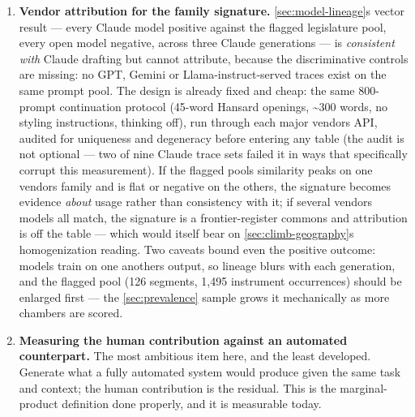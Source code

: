\begin{enumerate}
  This pairs directly with item 4. A register-feature profile is a measurable
  \emph{automated counterpart}: it says what an aligned model\textquotesingle s stance profile
  looks like on the same task, so a speaker\textquotesingle s distance from it is the residual
  item 4 asks for --- and unlike a detector score it decomposes into named
  features rather than one number. It also gives item 1\textquotesingle s register/substance
  split a principled rule, since the two lists are constructed by different
  criteria rather than by splitting one list in half.
\item
  \textbf{Vendor attribution for the family signature.} \cref{sec:model-lineage}\textquotesingle s vector result ---
  every Claude model positive against the flagged legislature pool, every
  open model negative, across three Claude generations --- is \emph{consistent
  with} Claude drafting but cannot attribute, because the discriminative
  controls are missing: no GPT, Gemini or Llama-instruct-served traces exist
  on the same prompt pool. The design is already fixed and cheap: the same
  800-prompt continuation protocol (45-word Hansard openings, \textasciitilde300 words,
  no styling instructions, thinking off), run through each major vendor\textquotesingle s
  API, audited for uniqueness and degeneracy before entering any table
  (the audit is not optional --- two of nine Claude trace sets failed it in
  ways that specifically corrupt this measurement). If the flagged pool\textquotesingle s
  similarity peaks on one vendor\textquotesingle s family and is flat or negative on the
  others, the signature becomes evidence \emph{about} usage rather than
  consistency with it; if several vendors\textquotesingle{} models all match, the signature
  is a frontier-register commons and attribution is off the table --- which
  would itself bear on \cref{sec:climb-geography}\textquotesingle s homogenization reading. Two caveats bound
  even the positive outcome: models train on one another\textquotesingle s output, so
  lineage blurs with each generation, and the flagged pool (126 segments,
  1,495 instrument occurrences) should be enlarged first --- the \cref{sec:prevalence} sample
  grows it mechanically as more chambers are scored.
\item
  \textbf{Measuring the human contribution against an automated counterpart.}
  The most ambitious item here, and the least developed. Generate what a fully
  automated system would produce given the same task and context; the human
  contribution is the residual. This is the marginal-product definition done
  properly, and it is measurable today.


\end{enumerate}
